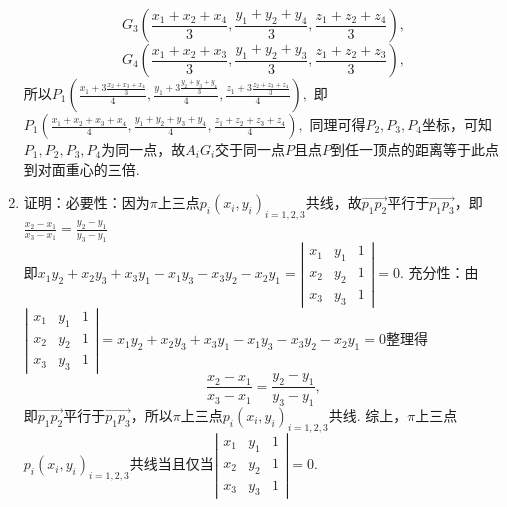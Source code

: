 \documentclass[UTF8]{ctexart}
\begin{document}
\begin{enumerate}
$$G_{3}\left(\displaystyle\frac{x_1+x_2+x_4}{3},\displaystyle\frac{y_1+y_2+y_4}{3},\displaystyle\frac{z_1+z_2+z_4}{3}\right),$$
$$G_{4}\left(\displaystyle\frac{x_1+x_2+x_3}{3},\displaystyle\frac{y_1+y_2+y_3}{3},\displaystyle\frac{z_1+z_2+z_3}{3}\right),$$
所以$P_{1}\left(\displaystyle\frac{x_1+3\displaystyle\frac{x_2+x_3+x_4}{3}}{4},\displaystyle\frac{y_1+3\displaystyle\frac{y_2+y_3+y_4}{3}}{4},\displaystyle\frac{z_1+3\displaystyle\frac{z_2+z_3+z_4}{3}}{4}\right),$
即$P_{1}\left(\displaystyle\frac{x_1+x_2+x_3+x_4}{4},\displaystyle\frac{y_1+y_2+y_3+y_4}{4},\displaystyle\frac{z_1+z_2+z_3+z_4}{4}\right),$
同理可得$P_{2},P_{3},P_{4}$坐标，可知$P_{1},P_{2},P_{3},P_{4}$为同一点，故$A_{i}G_{i}$交于同一点$P$且点$P$到任一顶点的距离等于此点到对面重心的三倍. 

\item 证明：必要性：因为$\pi$上三点$p_{i}\left(x_i,y_i\right)_{i=1,2,3}$共线，故$\overrightarrow{p_1p_2}$平行于$\overrightarrow{p_1p_3}$，即$\displaystyle\frac{x_2-x_1}{x_3-x_1}=\displaystyle\frac{y_2-y_1}{y_3-y_1}$\\
即$x_1y_2+x_2y_3+x_3y_1-x_1y_3-x_3y_2-x_2y_1=\left|\begin{array}{ccc}x_1&y_1&1\\x_2&y_2&1\\x_3&y_3&1\end{array}\right|=0$.
充分性：由$\left|\begin{array}{ccc}x_1&y_1&1\\x_2&y_2&1\\x_3&y_3&1\end{array}\right|=x_1y_2+x_2y_3+x_3y_1-x_1y_3-x_3y_2-x_2y_1=0$整理得$$\displaystyle\frac{x_2-x_1}{x_3-x_1}=\displaystyle\frac{y_2-y_1}{y_3-y_1},$$
即$\overrightarrow{p_1p_2}$平行于$\overrightarrow{p_1p_3}$，所以$\pi$上三点$p_{i}\left(x_i,y_i\right)_{i=1,2,3}$共线. 
综上，$\pi$上三点$p_{i}\left(x_i,y_i\right)_{i=1,2,3}$共线当且仅当$\left|\begin{array}{ccc}x_1&y_1&1\\x_2&y_2&1\\x_3&y_3&1\end{array}\right|=0.$


\end{enumerate}
\end{document}
